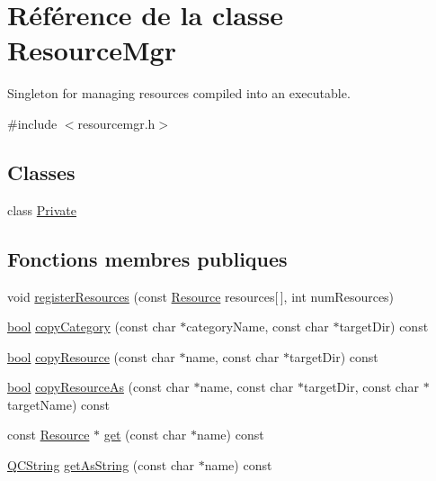 \hypertarget{class_resource_mgr}{}\section{Référence de la classe Resource\+Mgr}
\label{class_resource_mgr}


Singleton for managing resources compiled into an executable.  




{\ttfamily \#include $<$resourcemgr.\+h$>$}

\subsection*{Classes}
\begin{DoxyCompactItemize}
\item 
class \hyperlink{class_resource_mgr_1_1_private}{Private}
\end{DoxyCompactItemize}
\subsection*{Fonctions membres publiques}
\begin{DoxyCompactItemize}
\item 
void \hyperlink{class_resource_mgr_a2894f6f64a5376dfc475bde3f8acd0f3}{register\+Resources} (const \hyperlink{struct_resource}{Resource} resources\mbox{[}$\,$\mbox{]}, int num\+Resources)
\item 
\hyperlink{qglobal_8h_a1062901a7428fdd9c7f180f5e01ea056}{bool} \hyperlink{class_resource_mgr_ae5b15c9ca20c48687a25568f2d5ca584}{copy\+Category} (const char $\ast$category\+Name, const char $\ast$target\+Dir) const 
\item 
\hyperlink{qglobal_8h_a1062901a7428fdd9c7f180f5e01ea056}{bool} \hyperlink{class_resource_mgr_a9228da2e127bd9e78b04223eecb88136}{copy\+Resource} (const char $\ast$name, const char $\ast$target\+Dir) const 
\item 
\hyperlink{qglobal_8h_a1062901a7428fdd9c7f180f5e01ea056}{bool} \hyperlink{class_resource_mgr_acd241b543ffa91530190d9b189625080}{copy\+Resource\+As} (const char $\ast$name, const char $\ast$target\+Dir, const char $\ast$target\+Name) const 
\item 
const \hyperlink{struct_resource}{Resource} $\ast$ \hyperlink{class_resource_mgr_ac2cb332c4dfba7d45e5615cae4e05937}{get} (const char $\ast$name) const 
\item 
\hyperlink{class_q_c_string}{Q\+C\+String} \hyperlink{class_resource_mgr_aadb4a3796bba9cf4b2fc097f3aebd071}{get\+As\+String} (const char $\ast$name) const 
\end{DoxyCompactItemize}
